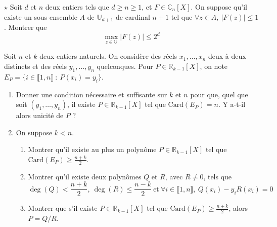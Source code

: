 \documentclass[french,a4paper]{article}
\newcommand{\R}{\mathbb{R}}
\newcommand{\C}{\mathbb{C}}
\newcommand{\U}{\mathbb{U}}
\newcommand{\card}{\text{Card}}
\theoremstyle{plain}
\theoremstyle{definition}
\theoremstyle{remark}
\begin{document}
\begin{ex}{$\star$}
	Soit $d$ et $n$ deux entiers tels que $d\geqslant n\geqslant 1$, et $F\in\C_n[X]$. On suppose qu'il existe un sous-ensemble $A$ de $\U_{d+1}$ de cardinal $n+1$ tel que $\forall z\in A,\ \lvert F(z)\rvert\leqslant 1$. Montrer que $$\max_{z\in\U}\lvert F(z)\rvert\leqslant 2^d$$
\end{ex}

\begin{ex}{}
	Soit $n$ et $k$ deux entiers naturels. On considère des réels $x_1,\ldots,x_n$ deux à deux distincts et des réels $y_1,\ldots,y_n$ quelconques. Pour $P\in\R_{k-1}[X]$, on note $E_P=\{i\in\llbracket1,n\rrbracket\ : \ P(x_i)=y_i\}$.
	\begin{enumerate}
		\item Donner une condition nécessaire et suffisante sur $k$ et $n$ pour que, quel que soit $(y_1,\ldots,y_n)$, il existe $P\in\R_{k-1}[X]$ tel que $\card(E_P)=n$. Y a-t-il alors unicité de $P$ ?
		\item On suppose $k< n$.
		\begin{enumerate}[label=\alph*.]
			\item Montrer qu'il existe au plus un polynôme $P\in\R_{k-1}[X]$ tel que $\displaystyle\card(E_P)\geqslant\frac{n+k}{2}$.
			\item Montrer qu'il existe deux polynômes $Q$ et $R$, avec $R\ne 0$, tels que $$\deg(Q)<\frac{n+k}{2},\ \deg(R)\leqslant\frac{n-k}{2}\ \text{et}\ \forall i\in\llbracket1,n\rrbracket,\ Q(x_i)-y_iR(x_i)=0$$
			\item Montrer que s'il existe $P\in\R_{k-1}[X]$ tel que $\displaystyle\card(E_P)\geqslant\frac{n+k}{2}$, alors $P=Q/R$.
		\end{enumerate}
	\end{enumerate}
\end{ex}
\end{document}

